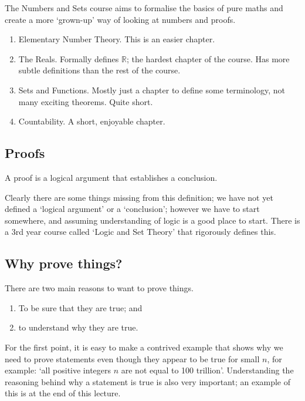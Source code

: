 
The Numbers and Sets course aims to formalise the basics of pure maths and create a more `grown-up' way of looking at numbers and proofs.

\begin{enumerate}
	\item Elementary Number Theory.
	      This is an easier chapter.
	\item The Reals.
	      Formally defines \(\mathbb{R}\); the hardest chapter of the course.
	      Has more subtle definitions than the rest of the course.
	\item Sets and Functions.
	      Mostly just a chapter to define some terminology, not many exciting theorems.
	      Quite short.
	\item Countability.
	      A short, enjoyable chapter.
\end{enumerate}

\subsection{Proofs}
\begin{definition}[Proof]
	A proof is a logical argument that establishes a conclusion.
\end{definition}

Clearly there are some things missing from this definition; we have not yet defined a `logical argument' or a `conclusion'; however we have to start somewhere, and assuming understanding of logic is a good place to start.
There is a 3rd year course called `Logic and Set Theory' that rigorously defines this.

\subsection{Why prove things?}
There are two main reasons to want to prove things.
\begin{enumerate}
	\item To be sure that they are true; and
	\item to understand why they are true.
\end{enumerate}

For the first point, it is easy to make a contrived example that shows why we need to prove statements even though they appear to be true for small \(n\), for example: `all positive integers \(n\) are not equal to 100 trillion'.
Understanding the reasoning behind why a statement is true is also very important; an example of this is at the end of this lecture.

